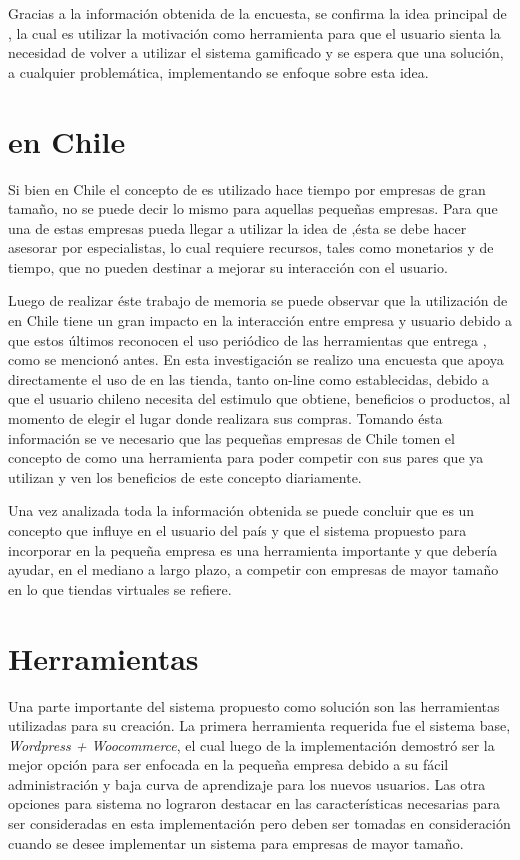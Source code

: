 Gracias a la información obtenida de la encuesta, se confirma la
idea principal de {\gam}, la cual es utilizar la motivación como herramienta para
que el usuario sienta la necesidad de volver a utilizar el sistema gamificado y
se espera que una solución, a cualquier problemática, implementando {\gam} se
enfoque sobre esta idea.

\section{{\GAM} en Chile}

Si bien en Chile el concepto de {\gam} es utilizado hace tiempo por empresas de gran tamaño, no se
puede decir lo mismo para aquellas pequeñas empresas. Para que una de estas empresas pueda
llegar a utilizar la idea de {\gam},ésta se debe hacer asesorar por especialistas, lo cual
requiere recursos, tales como monetarios y de tiempo, que no pueden destinar a mejorar su interacción con el usuario.

Luego de realizar éste trabajo de memoria se puede observar que la utilización de {\gam} en Chile tiene
un gran impacto en la interacción entre empresa y usuario debido a que estos últimos reconocen el uso
periódico de las herramientas que entrega {\gam}, como se mencionó antes.
En esta investigación se realizo una encuesta que apoya directamente el uso de {\gam} en las tienda, tanto
on-line como establecidas, debido a que el usuario chileno necesita del estimulo que obtiene, beneficios o productos,
al momento de elegir el lugar donde realizara sus compras. Tomando ésta información se ve necesario que las
pequeñas empresas de Chile tomen el concepto de {\gam} como una herramienta para poder competir con sus
pares que ya utilizan {\gam} y ven los beneficios de este concepto diariamente.

Una vez analizada toda la información obtenida se puede concluir que {\gam} es un concepto que influye
en el usuario del país y que el sistema propuesto para incorporar {\gam} en la pequeña empresa
es una herramienta importante y que debería ayudar, en el mediano a largo plazo, a competir con empresas
de mayor tamaño en lo que tiendas virtuales se refiere.

\section{Herramientas}

Una parte importante del sistema propuesto como solución son las herramientas utilizadas para su creación.
La primera herramienta requerida fue el sistema base, \emph{Wordpress + Woocommerce}, el cual luego de
la implementación demostró ser la mejor opción para ser enfocada en la pequeña empresa debido a su
fácil administración y baja curva de aprendizaje para los nuevos usuarios. Las otra opciones para sistema no lograron
destacar en las características necesarias para ser consideradas en esta implementación pero deben ser
tomadas en consideración cuando se desee implementar un sistema para empresas de mayor tamaño.

